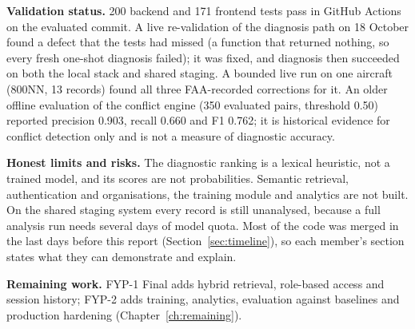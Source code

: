 \textbf{Validation status.} 200 backend and 171 frontend tests pass in GitHub Actions on the evaluated commit. A live re-validation of the diagnosis path on 18 October found a defect that the tests had missed (a function that returned nothing, so every fresh one-shot diagnosis failed); it was fixed, and diagnosis then succeeded on both the local stack and shared staging. A bounded live run on one aircraft (800NN, 13 records) found all three FAA-recorded corrections for it. An older offline evaluation of the conflict engine (350 evaluated pairs, threshold 0.50) reported precision 0.903, recall 0.660 and F1 0.762; it is historical evidence for conflict detection only and is not a measure of diagnostic accuracy.

\textbf{Honest limits and risks.} The diagnostic ranking is a lexical heuristic, not a trained model, and its scores are not probabilities. Semantic retrieval, authentication and organisations, the training module and analytics are not built. On the shared staging system every record is still unanalysed, because a full analysis run needs several days of model quota. Most of the code was merged in the last days before this report (Section~\ref{sec:timeline}), so each member's section states what they can demonstrate and explain.

\textbf{Remaining work.} FYP-1 Final adds hybrid retrieval, role-based access and session history; FYP-2 adds training, analytics, evaluation against baselines and production hardening (Chapter~\ref{ch:remaining}).
